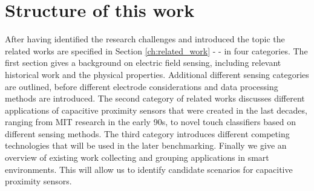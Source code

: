 
\section{Structure of this work}
After having identified the research challenges and introduced the topic the related works are specified in Section \ref{ch:related_work} - \emph{} - in four categories. The first section gives a background on electric field sensing, including relevant historical work and the physical properties. Additional different sensing categories are outlined, before different electrode considerations and data processing methods are introduced. The second category of related works discusses different applications of capacitive proximity sensors that were created in the last decades, ranging from MIT research in the early 90s, to novel touch classifiers based on different sensing methods. The third category introduces different competing technologies that will be used in the later benchmarking. Finally we give an overview of existing work collecting and grouping applications in smart environments. This will allow us to identify candidate scenarios for capacitive proximity sensors.

